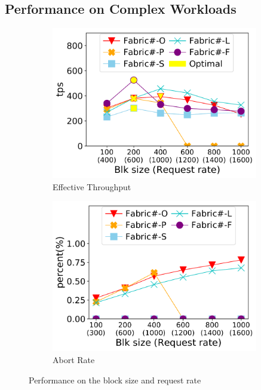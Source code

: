 \subsection{Performance on Complex Workloads}
\label{sec:txn:exp:complex}
\begin{figure}[t]
	\centering
    \begin{subfigure}{0.45\textwidth}
      \includegraphics[width=0.99\textwidth]{chart/txn/complex_blksize_thruput.pdf}
      \caption{Effective Throughput}
      \label{chart:txn:blksize:thruput}
    \end{subfigure}
    \begin{subfigure}{0.45\textwidth}
      \includegraphics[width=0.99\textwidth]{chart/txn/complex_blksize_abort.pdf}
      \caption{Abort Rate}
      \label{chart:txn:blksize:abort}
    \end{subfigure}
    \caption{Performance on the block size and request rate}
    \label{chart:txn:blksize}
\end{figure}

